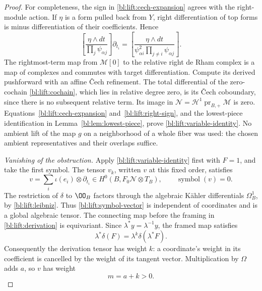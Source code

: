\begin{proof}
For completeness, the sign in \eqref{bl:lift:cech-expansion} agrees with
the right-module action.  If \(\eta\) is a form pulled back from
\(Y\), right differentiation of top forms is minus differentiation of
their coefficients.  Hence
\begin{equation}\label{bl:lift:right-sign}
 \left[\frac{\eta\wedge dt}{\prod_j\psi_{\alpha j}}\right]
       \partial_{t_i}
 =\left[\frac{\eta\wedge dt}
 {\psi_{\alpha i}^{2}\prod_{j\ne i}\psi_{\alpha j}}\right].
\end{equation}
The rightmost-term map from \(\mathcal M[0]\) to the relative right
de Rham complex is a map of complexes and commutes with target
differentiation.  Compute its derived pushforward with an affine
\v{C}ech refinement.  The total differential of the zero-cochain
\eqref{bl:lift:cochain}, which lies in relative degree zero, is its
\v{C}ech coboundary, since there is no subsequent relative term.
Its image in \(\mathcal N=\mathcal H^1\operatorname{pr}_{B,+}
\mathcal M\) is zero.  Equations~\eqref{bl:lift:cech-expansion}
and~\eqref{bl:lift:right-sign}, and the lowest-piece identification in
Lemma~\ref{bl:lem:lowest-piece}, prove \eqref{bl:lift:variable-identity}.
No ambient lift of the map \(g\) on a neighborhood of a whole fiber
was used: the chosen ambient representatives and their overlaps suffice.

\smallskip\noindent
\emph{Vanishing of the obstruction.}
Apply \eqref{bl:lift:variable-identity} first with \(F=1\), and take the
first symbol. The tensor \(v_k\), written \(v\) at this fixed order, satisfies
\begin{equation}\label{bl:lift:symbol-vector}
 v=\sum_i\iota(e_i)\otimes\partial_{t_i}
 \in H^0(B,F_0\mathcal N\otimes T_B),
 \qquad \operatorname{symbol}(v)=0.
\end{equation}
The restriction of \(\delta\) to \(\OO_B\) factors through the
algebraic K\"ahler differentials \(\Omega_B^1\), by
\eqref{bl:lift:leibniz}.  Thus \eqref{bl:lift:symbol-vector} is independent
of coordinates and is a global algebraic tensor.
The connecting map before the framing in \eqref{bl:lift:derivation} is
equivariant.  Since \(\lambda^*y=\lambda^{-1}y\), the framed map
satisfies
\[
 \lambda^*\delta(F)=\lambda^k\delta(\lambda^*F).
\]
Consequently the derivation tensor has weight \(k\): a coordinate's
weight in its coefficient is cancelled by the weight of its tangent
vector.  Multiplication by \(\Omega\) adds \(a\), so \(v\) has
weight
\begin{equation}\label{bl:lift:positive-weight}
 m=a+k>0.
\end{equation}


\end{proof}
